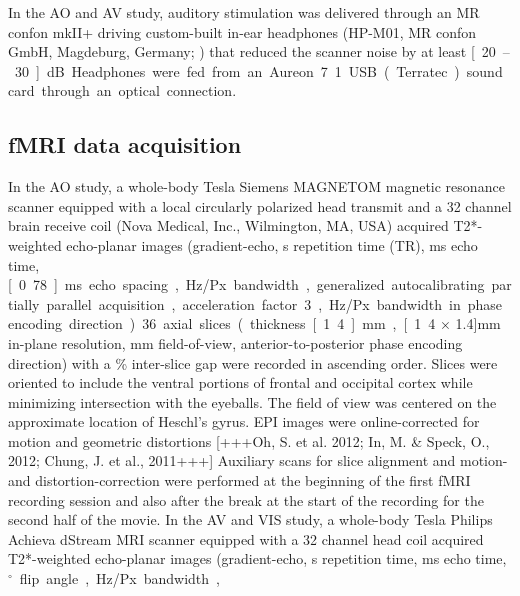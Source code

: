 \documentclass[english]{article}
\begin{document}

In the AO and AV study, auditory stimulation was delivered through an MR confon
mkII+ driving custom-built in-ear headphones (HP-M01, MR confon GmbH, Magdeburg,
Germany; \citep{baumgart1998electrodynamic}) that reduced the scanner noise by
at least \unit[20–30]{dB}. Headphones were fed from an Aureon 7.1 USB (Terratec)
sound card through an optical connection.


\subsection{fMRI data acquisition}


In the AO study, a whole-body \unit[7]{Tesla} Siemens MAGNETOM magnetic
resonance scanner equipped with a local circularly polarized head transmit and a
32 channel brain receive coil (Nova Medical, Inc., Wilmington, MA, USA) acquired
T2*-weighted echo-planar images (gradient-echo, \unit[2]{s} repetition time
(TR), \unit[22]{ms} echo time, \unit[0.78]{ms} echo spacing, \unit[1488]{Hz/Px}
bandwidth, generalized autocalibrating partially parallel acquisition,
acceleration factor 3, \unit[2]{Hz/Px} bandwidth in phase encoding direction).
36 axial slices (thickness \unit[1.4]{mm}, \unit[1.4 $\times$ 1.4]{mm} in-plane
resolution, \unit[224]{mm} field-of-view, anterior-to-posterior phase encoding
direction) with a \unit[10]{\%} inter-slice gap were recorded in ascending
order.
Slices were oriented to include the ventral portions of frontal and occipital
cortex while minimizing intersection with the eyeballs.
The field of view was centered on the approximate location of Heschl's gyrus.
EPI images were online-corrected for motion and geometric distortions [+++Oh, S.
et al. 2012; In, M. \& Speck, O., 2012; Chung, J. et al., 2011+++]
Auxiliary scans for slice alignment and motion- and distortion-correction were
performed at the beginning of the first fMRI recording session and also after
the break at the start of the recording for the second half of the movie.
In the AV and VIS study, a whole-body \unit[3]{Tesla} Philips Achieva dStream
MRI scanner equipped with a 32 channel head coil acquired T2*-weighted
echo-planar images (gradient-echo, \unit[2]{s} repetition time, \unit[30]{ms}
echo time, \unit[90]{$^{\circ}$} flip angle, \unit[1943]{Hz/Px} bandwidth,
\end{document}
